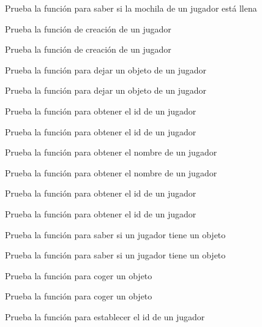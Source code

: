\begin{DoxyRefList}
Prueba la función para saber si la mochila de un jugador está llena  
\item[\label{test__test000205}%
\Hypertarget{test__test000205}%
Member \hyperlink{player__test_8h_a4f6eca5f9d8c08d2a7fc70c209ecf854}{test2\+\_\+player\+\_\+create} ()]Prueba la función de creación de un jugador 

Prueba la función de creación de un jugador  
\item[\label{test__test000220}%
\Hypertarget{test__test000220}%
Member \hyperlink{player__test_8h_a2b1d4db679c85da5bd43347c583112f4}{test2\+\_\+player\+\_\+drop\+\_\+object} ()]Prueba la función para dejar un objeto de un jugador 

Prueba la función para dejar un objeto de un jugador  
\item[\label{test__test000216}%
\Hypertarget{test__test000216}%
Member \hyperlink{player__test_8h_a9fa80f0c0e46b45eb9f1685b102a5826}{test2\+\_\+player\+\_\+get\+\_\+id} ()]Prueba la función para obtener el id de un jugador 

Prueba la función para obtener el id de un jugador  
\item[\label{test__test000214}%
\Hypertarget{test__test000214}%
Member \hyperlink{player__test_8h_a3aa908fd360b74e7786422260e8e16a0}{test2\+\_\+player\+\_\+get\+\_\+name} ()]Prueba la función para obtener el nombre de un jugador 

Prueba la función para obtener el nombre de un jugador  
\item[\label{test__test000218}%
\Hypertarget{test__test000218}%
Member \hyperlink{player__test_8h_a4f9a990391473b00c42c6c285ec7ee37}{test2\+\_\+player\+\_\+get\+\_\+space\+\_\+id} ()]Prueba la función para obtener el id de un jugador 

Prueba la función para obtener el id de un jugador  
\item[\label{test__test000224}%
\Hypertarget{test__test000224}%
Member \hyperlink{player__test_8h_ae8953d45d8f555a930dbc8aba101d399}{test2\+\_\+player\+\_\+has\+\_\+object} ()]Prueba la función para saber si un jugador tiene un objeto 

Prueba la función para saber si un jugador tiene un objeto  
\item[\label{test__test000222}%
\Hypertarget{test__test000222}%
Member \hyperlink{player__test_8h_aab964f085041375e79d42d314c5a2202}{test2\+\_\+player\+\_\+pick\+\_\+object} ()]Prueba la función para coger un objeto 

Prueba la función para coger un objeto  
\item[\label{test__test000210}%
\Hypertarget{test__test000210}%
Member \hyperlink{player__test_8h_a3695e0896bc3d770290e6a691fa212f7}{test2\+\_\+player\+\_\+set\+\_\+id} ()]Prueba la función para establecer el id de un jugador 


\end{DoxyRefList}
